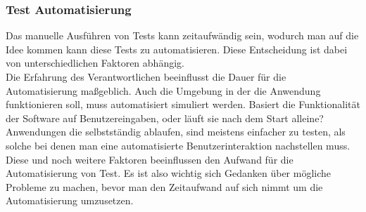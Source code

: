 \documentclass[12pt,a4paper]{article}
\begin{document}
\subsubsection{Test Automatisierung}
Das manuelle Ausführen von Tests kann zeitaufwändig sein, wodurch man auf die Idee kommen kann diese Tests zu automatisieren. Diese Entscheidung ist dabei von unterschiedlichen Faktoren abhängig. \\
Die Erfahrung des Verantwortlichen beeinflusst die Dauer für die Automatisierung maßgeblich. Auch die Umgebung in der die Anwendung funktionieren soll, muss automatisiert simuliert werden. Basiert die Funktionalität der Software auf Benutzereingaben, oder läuft sie nach dem Start alleine? Anwendungen die selbstständig ablaufen, sind meistens einfacher zu testen, als solche bei denen man eine automatisierte Benutzerinteraktion nachstellen muss\cite{fewster1999software}. \\
Diese und noch weitere Faktoren beeinflussen den Aufwand für die Automatisierung von Test. Es ist also wichtig sich Gedanken über mögliche Probleme zu machen, bevor man den Zeitaufwand auf sich nimmt um die Automatisierung umzusetzen. 
\end{document}
